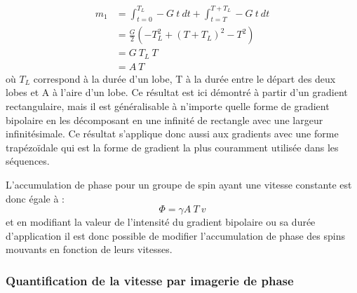 	\begin{equation}
	\begin{split}
	m_1 &= \int_{t=0}^{T_L} -G \ t \ dt  + \int_{t=T}^{T+T_L} -G \ t \ dt  \\
			&= \frac{G}{2}\left(-T_L^2+(T+T_L)^2-T^2\right) \\
			&=G \ T_L \ T \\
			& = A \ T
	\end{split} 
	\end{equation}	
où $T_L$ correspond à la durée d'un lobe, T à la durée entre le départ des deux lobes et A à l'aire d'un lobe. Ce résultat est ici démontré à partir d'un gradient rectangulaire, mais il est généralisable à n'importe quelle forme de gradient bipolaire en les décomposant en une infinité de rectangle avec une largeur infinitésimale. Ce résultat s'applique donc aussi aux gradients avec une forme trapézoïdale qui est la forme de gradient la plus couramment utilisée dans les séquences.

L'accumulation de phase pour un groupe de spin ayant une vitesse constante est donc égale à :
\begin{equation}
\Phi = \gamma A \ T \ v
\end{equation}
et en modifiant la valeur de l'intensité du gradient bipolaire ou sa durée d'application il est donc possible de modifier l'accumulation de phase des spins mouvants en fonction de leurs vitesses.

\subsubsection{Quantification de la vitesse par imagerie de phase}

